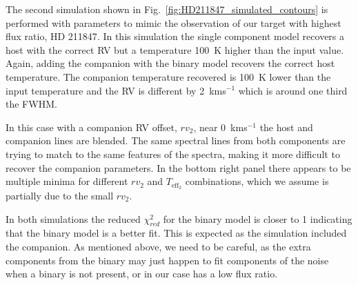 \documentclass[fleqn,usenatbib]{mnras}
\begin{document}
The second simulation shown in Fig.~\ref{fig:HD211847_simulated_contours} is performed with parameters to mimic the observation of our target with highest flux ratio, {HD 211847}. In this simulation the single component model recovers a host with the correct RV but a temperature 100~K higher than the input value. Again, adding the companion with the binary model recovers the correct host temperature. The companion temperature recovered is 100~K lower than the input temperature and the RV is different by 2~kms\(^{-1}\) which is around one third the FWHM.

In this case with a companion RV offset, \({rv}_2\), near 0~kms\(^{-1}\) the host and companion lines are blended. The same spectral lines from both components are trying to match to the same features of the spectra, making it more difficult to recover the companion parameters. In the bottom right panel there appears to be multiple minima for different \({rv}_2\) and \(T_{\textrm{eff}_2}\) combinations, which we assume is partially due to the small \({rv}_2\).


In both simulations the reduced \(\chi^2_{red}\) for the binary model is closer to 1 indicating that the binary model is a better fit. This is expected as the simulation included the companion. As mentioned above, we need to be careful, as the extra components from the binary may just happen to fit components of the noise when a binary is not present, or in our case has a low flux ratio.


\end{document}
